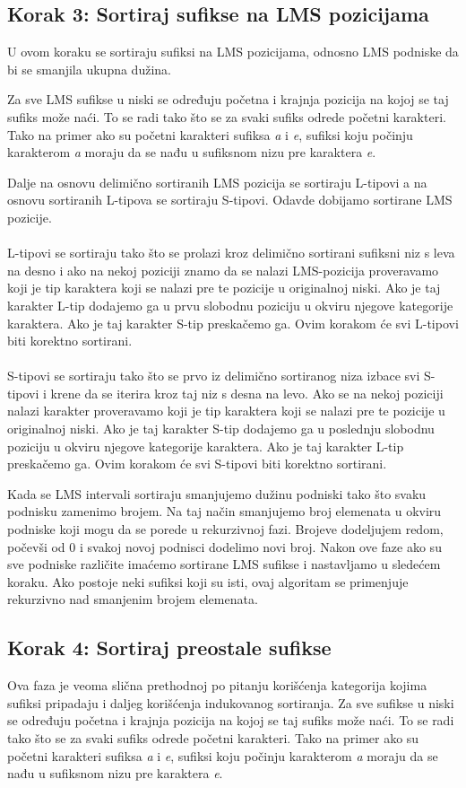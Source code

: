 \documentclass[serbian]{article}
\begin{document}
\subsection{Korak 3: Sortiraj sufikse na LMS pozicijama}
U ovom koraku se sortiraju sufiksi na LMS pozicijama, odnosno LMS podniske da bi se smanjila ukupna dužina.

Za sve LMS sufikse u niski se određuju početna i krajnja pozicija na kojoj se taj sufiks može naći. To se radi tako što se za svaki sufiks odrede početni karakteri. Tako na primer ako su početni karakteri sufiksa \textit{a} i \textit{e}, sufiksi koju počinju karakterom \textit{a} moraju da se nađu u sufiksnom nizu pre karaktera \textit{e}.

Dalje na osnovu delimično sortiranih LMS pozicija se sortiraju L-tipovi a na osnovu sortiranih L-tipova se sortiraju S-tipovi.
Odavde dobijamo sortirane LMS pozicije.
\\\\
L-tipovi se sortiraju tako što se prolazi kroz delimično sortirani sufiksni niz s leva na desno i ako na nekoj poziciji znamo da se nalazi LMS-pozicija proveravamo koji je tip karaktera koji se nalazi pre te pozicije u originalnoj niski. Ako je taj karakter L-tip dodajemo ga u prvu slobodnu poziciju u okviru njegove kategorije karaktera. Ako je taj karakter S-tip preskačemo ga.
Ovim korakom će svi L-tipovi biti korektno sortirani.
\\\\
S-tipovi se sortiraju tako što se prvo iz delimično sortiranog niza izbace svi S-tipovi i krene da se iterira kroz taj niz s desna na levo.
Ako se na nekoj poziciji nalazi karakter proveravamo koji je tip karaktera koji se nalazi pre te pozicije u originalnoj niski. Ako je taj karakter S-tip dodajemo ga u poslednju slobodnu poziciju u okviru njegove kategorije karaktera. Ako je taj karakter L-tip preskačemo ga.
Ovim korakom će svi S-tipovi biti korektno sortirani.


Kada se LMS intervali sortiraju smanjujemo dužinu podniski tako što svaku podnisku zamenimo brojem. Na taj način smanjujemo broj elemenata u okviru podniske koji mogu da se porede u rekurzivnoj fazi. Brojeve dodeljujem redom, počevši od 0 i svakoj novoj podnisci dodelimo novi broj.
Nakon ove faze ako su sve podniske različite imaćemo sortirane LMS sufikse i nastavljamo u sledećem koraku.
Ako postoje neki sufiksi koji su isti, ovaj algoritam se primenjuje rekurzivno nad smanjenim brojem elemenata.

\subsection{Korak 4: Sortiraj preostale sufikse}
Ova faza je veoma slična prethodnoj po pitanju korišćenja kategorija kojima sufiksi pripadaju i daljeg korišćenja indukovanog sortiranja.
Za sve sufikse u niski se određuju početna i krajnja pozicija na kojoj se taj sufiks može naći. To se radi tako što se za svaki sufiks odrede početni karakteri. Tako na primer ako su početni karakteri sufiksa \textit{a} i \textit{e}, sufiksi koju počinju karakterom \textit{a} moraju da se nađu u sufiksnom nizu pre karaktera \textit{e}.
\end{document}
